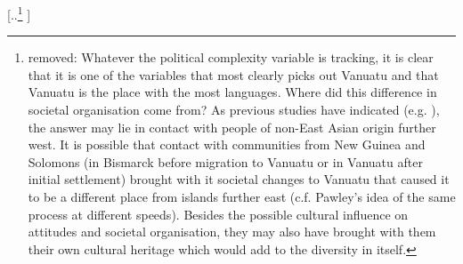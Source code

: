 \documentclass[unnumsec,webpdf,modern,medium]{oup-authoring-template}
\providecommand{\DIFdeltex}[1]{{\protect\color{red} [..\footnote{removed: #1} ]}} %
\providecommand{\DIFdel}[1]{\texorpdfstring{\DIFdeltex{#1}}{}} %
\begin{document}
\DIFdel{Whatever the political complexity variable is tracking, it is clear that it is one of the variables that most clearly picks out Vanuatu and that Vanuatu is the place with the most languages. Where did this difference in societal organisation come from? As previous studies have indicated (e.g. \citet{lynch1981melanesian}), the answer may lie in contact with people of non-East Asian origin further west. It is possible that contact with communities from New Guinea and Solomons (in Bismarck before migration to Vanuatu or in Vanuatu after initial settlement) brought with it societal changes to Vanuatu that caused it to be a different place from islands further east (c.f. Pawley's idea of the same process at different speeds). Besides the possible cultural influence on attitudes and societal organisation,
they may also have brought with them their own cultural heritage which would add to the diversity in itself.
}%



\end{document}
